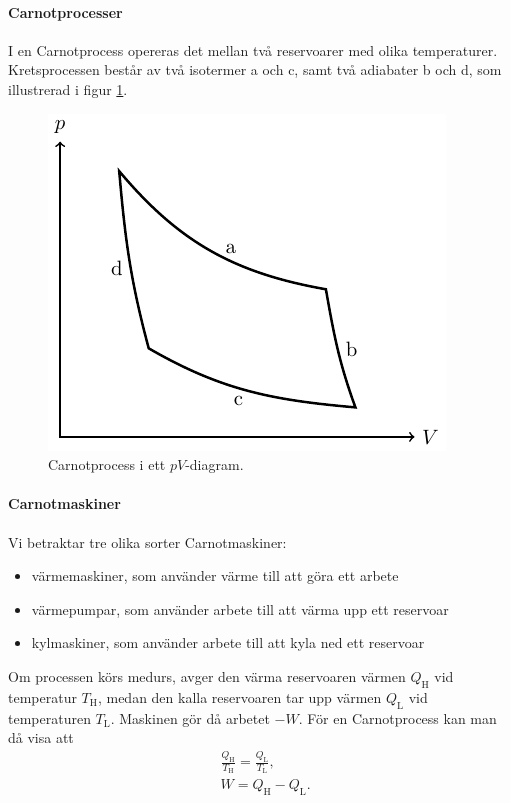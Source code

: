 \paragraph{Carnotprocesser}
I en Carnotprocess opereras det mellan två reservoarer med olika temperaturer. Kretsprocessen består av två isotermer a och c, samt två adiabater b och d, som illustrerad i figur \ref{fig:carnot_cycle}.
\begin{figure}[!ht]
	\centering
	\includegraphics[width = \linewidth]{./Images/carnot/carnot.pdf}
	\caption{Carnotprocess i ett $pV$-diagram.}
	\label{fig:carnot_cycle}
\end{figure}

\paragraph{Carnotmaskiner}

Vi betraktar tre olika sorter Carnotmaskiner:
\begin{itemize}
	\item värmemaskiner, som använder värme till att göra ett arbete
	\item värmepumpar, som använder arbete till att värma upp ett reservoar
	\item kylmaskiner, som använder arbete till att kyla ned ett reservoar
\end{itemize}
Om processen körs medurs, avger den värma reservoaren värmen $Q_\text{H}$ vid temperatur $T_\text{H}$, medan den kalla reservoaren tar upp värmen $Q_\text{L}$ vid temperaturen $T_\text{L}$. Maskinen gör då arbetet $-W$. För en Carnotprocess kan man då visa att
\begin{align*}
	& \frac{Q_\text{H}}{T_\text{H}} = \frac{Q_\text{L}}{T_\text{L}}, \\
 	& W = Q_\text{H} - Q_\text{L}.
\end{align*}

